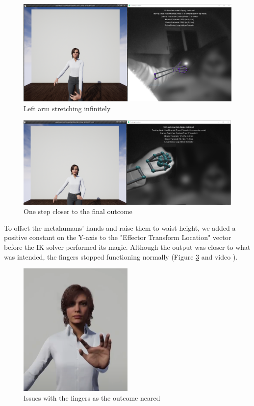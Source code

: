 \begin{figure}[!htb]
\includegraphics[width=\textwidth]{figures/handStretching.png}
\centering
\caption{Left arm stretching infinitely}
\label{fig:armsStretching}
\end{figure}

\begin{figure}[!htb]
\includegraphics[width=\textwidth]{figures/handMinPosition.png}
\centering
\caption{One step closer to the final outcome}
\label{fig:closeOutcome}
\end{figure}

To offset the metahumans' hands and raise them to waist height, we added a positive constant on the Y-axis to the "Effector Transform Location" vector before the IK solver performed its magic. Although the output was closer to what was intended, the fingers stopped functioning normally (Figure \ref{fig:fingersIssue} and video \cite{APT3}).

\begin{figure}[!htb]
\includegraphics[width=0.5\textwidth]{figures/otherIssue.png}
\centering
\caption{Issues with the fingers as the outcome neared}
\label{fig:fingersIssue}
\end{figure}

